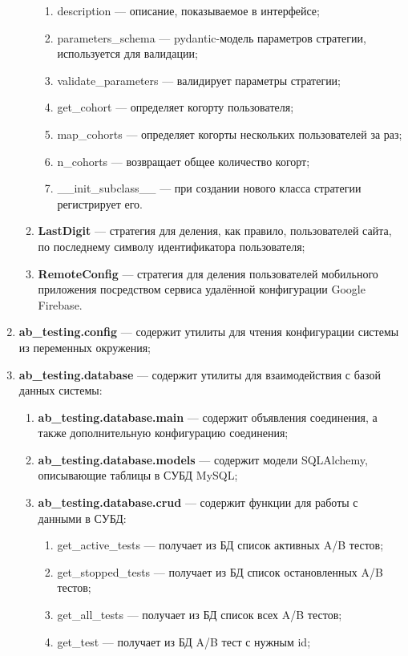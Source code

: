 \documentclass[../document.tex]{subfiles}
\begin{document}
\begin{enumerate}
\begin{enumerate}
\begin{enumerate}
				\item description --- описание, показываемое в интерфейсе;
				\item parameters\_schema --- pydantic-модель параметров стратегии, используется для валидации;
				\item validate\_parameters --- валидирует параметры стратегии;
				\item get\_cohort --- определяет когорту пользователя;
				\item map\_cohorts --- определяет когорты нескольких пользователей за раз;
				\item n\_cohorts --- возвращает общее количество когорт;
				\item \_\_init\_subclass\_\_ --- при создании нового класса стратегии регистрирует его.
			\end{enumerate}
			\item \textbf{LastDigit} --- стратегия для деления, как правило, пользователей сайта, по последнему символу идентификатора пользователя;
			\item \textbf{RemoteConfig} --- стратегия для деления пользователей мобильного приложения посредством сервиса удалённой конфигурации Google Firebase.
		\end{enumerate}
		\item \textbf{ab\_testing.config} --- содержит утилиты для чтения конфигурации системы из переменных окружения;
		\item \textbf{ab\_testing.database} --- содержит утилиты для взаимодействия с базой данных системы:
		\begin{enumerate}
			\item \textbf{ab\_testing.database.main} --- содержит объявления соединения, а также дополнительную конфигурацию соединения;
			\item \textbf{ab\_testing.database.models} --- содержит модели SQLAlchemy, описывающие таблицы в СУБД MySQL;
			\item \textbf{ab\_testing.database.crud} --- содержит функции для работы с данными в СУБД:
			\begin{enumerate}
				\item get\_active\_tests --- получает из БД список активных A/B тестов;
				\item get\_stopped\_tests --- получает из БД список остановленных A/B тестов;
				\item get\_all\_tests --- получает из БД список всех A/B тестов;
				\item get\_test --- получает из БД A/B тест с нужным id;

\end{enumerate}
\end{enumerate}
\end{enumerate}
\end{document}
